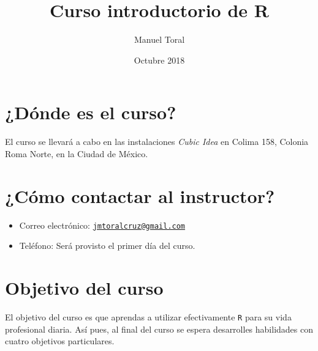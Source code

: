 \documentclass[]{article}
\title{Curso introductorio de R}
\author{Manuel Toral}
\date{Octubre 2018}
\providecommand{\tightlist}{%
  \setlength{\itemsep}{0pt}\setlength{\parskip}{0pt}}
\begin{document}
\maketitle

\section{¿Dónde es el curso?}\label{donde-es-el-curso}

El curso se llevará a cabo en las instalaciones \emph{Cubic Idea} en
Colima 158, Colonia Roma Norte, en la Ciudad de México.

\section{¿Cómo contactar al
instructor?}\label{como-contactar-al-instructor}

\begin{itemize}
\tightlist
\item
  Correo electrónico:
  \href{mailto:jmtoralcruz@gmail.com}{\nolinkurl{jmtoralcruz@gmail.com}}
\item
  Teléfono: Será provisto el primer día del curso.
\end{itemize}

\section{Objetivo del curso}\label{objetivo-del-curso}

El objetivo del curso es que aprendas a utilizar efectivamente
\texttt{R} para su vida profesional diaria. Así pues, al final del curso
se espera desarrolles habilidades con cuatro objetivos particulares.
\end{document}
